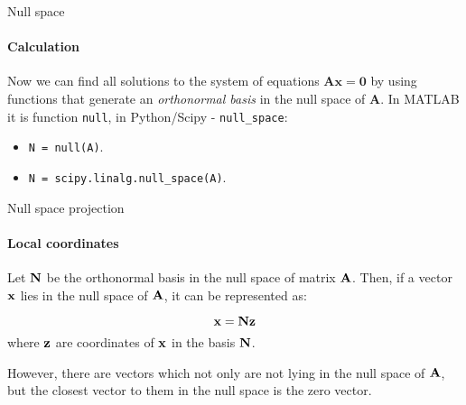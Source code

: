 \documentclass{beamer}
\begin{document}
\begin{frame}{Null space}
	\framesubtitle{Calculation}
	\begin{flushleft}
		
		Now we can find all solutions to the system of equations $\mathbf{A} \mathbf{x} = \mathbf{0}$ by using functions that generate an \emph{orthonormal basis} in the null space of $\mathbf{A}$. In MATLAB it is function \texttt{null}, in Python/Scipy - \texttt{null\_space}:
		
		\bigskip
		
		\begin{itemize}
			\item \texttt{N = null(A)}.
			\item \texttt{N = scipy.linalg.null\_space(A)}.
		\end{itemize}
		
		\bigskip
		
		
	\end{flushleft}
\end{frame}



\begin{frame}{Null space projection}
	\framesubtitle{Local coordinates}
	\begin{flushleft}
		
		Let $\mathbf{N}$ be the orthonormal basis in the null space of matrix $\mathbf{A}$. Then, if a vector $\mathbf{x}$ lies in the null space of $\mathbf{A}$, it can be represented as:
		
		\begin{equation}
			\mathbf{x} = \mathbf{N}\mathbf{z}
		\end{equation}
		where $\mathbf{z}$ are coordinates of $\mathbf{x}$ in the basis $\mathbf{N}$.
		
		\bigskip
		
		However, there are vectors which not only are not lying in the null space of $\mathbf{A}$,  but the closest vector to them in the null space is the zero vector.
		
	\end{flushleft}
\end{frame}
\end{document}
